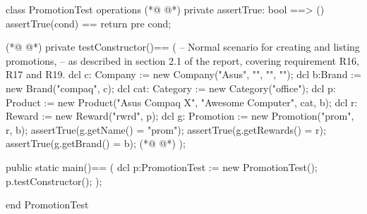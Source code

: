 \begin{vdmpp}[breaklines=true]
class PromotionTest
 operations
(*@
\label{assertTrue:3}
@*)
  private assertTrue: bool ==> ()
    assertTrue(cond) == return
    pre cond;
    
(*@
\label{testConstructor:7}
@*)
  private testConstructor()==
  (
    -- Normal scenario for creating and listing promotions,
     -- as described in section 2.1 of the report, covering requirement R16, R17 and R19.
      dcl c: Company := new Company("Asus", "", "", "");
      dcl b:Brand := new Brand("compaq", c);
      dcl cat: Category := new Category("office");
      dcl p: Product := new Product("Asus Compaq X", "Awesome Computer", cat, b);
      dcl r: Reward := new Reward("rwrd", p);
   dcl g: Promotion := new Promotion("prom", {r}, b);
   assertTrue(g.getName() = "prom");
   assertTrue(g.getRewards() = {r});
   assertTrue(g.getBrand() = b);
(*@
\label{main:20}
@*)
  );
 
  public static main()==
    (
   dcl p:PromotionTest := new PromotionTest();
   p.testConstructor();
    );

end PromotionTest
\end{vdmpp}
